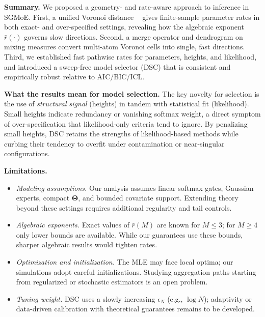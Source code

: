 \documentclass[twoside]{article}
\DeclareMathOperator*{\VDO}{D_{O}}
\theoremstyle{plain}
\theoremstyle{definition}
\theoremstyle{plain}
\def\vTheta{{\bm{\Theta}}}
\begin{document}
{\bf Summary.}
We proposed a geometry- and rate-aware approach to inference in SGMoE.
First, a unified Voronoi distance \(\VDO\) gives finite-sample parameter rates in both exact- and over-specified settings, revealing how the algebraic exponent \(\bar r(\cdot)\) governs slow directions.
Second, a merge operator and dendrogram on mixing measures convert multi-atom Voronoi cells into single, fast directions.
Third, we established fast pathwise rates for parameters, heights, and likelihood, and introduced a sweep-free model selector (DSC) that is consistent and empirically robust relative to AIC/BIC/ICL.

{\bf What the results mean for model selection.}
The key novelty for selection is the use of {\it structural signal} (heights) in tandem with statistical fit (likelihood).
Small heights indicate redundancy or vanishing softmax weight, a direct symptom of over-specification that likelihood-only criteria tend to ignore.
By penalizing small heights, DSC retains the strengths of likelihood-based methods while curbing their tendency to overfit under contamination or near-singular configurations.

{\bf Limitations.}
\begin{itemize}\itemsep0pt
\item {\it Modeling assumptions.} Our analysis assumes linear softmax gates, Gaussian experts, compact \(\vTheta\), and bounded covariate support. Extending theory beyond these settings requires additional regularity and tail controls.
\item {\it Algebraic exponents.} Exact values of \(\bar r(M)\) are known for \(M\le3\); for \(M\ge4\) only lower bounds are available. While our guarantees use these bounds, sharper algebraic results would tighten rates.
\item {\it Optimization and initialization.} The MLE may face local optima; our simulations adopt careful initializations. Studying aggregation paths starting from regularized or stochastic estimators is an open problem.
\item {\it Tuning weight.} DSC uses a slowly increasing \(\epsilon_N\) (e.g., \(\log N\)); adaptivity or data-driven calibration with theoretical guarantees remains to be developed.
\end{itemize}
\end{document}
